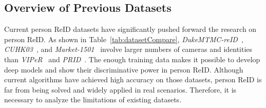 \documentclass[10pt,twocolumn,letterpaper]{article}
\begin{document}
\begin{table*}
\footnotesize
\begin{center}
\caption{Comparison between \emph{MSMT17} and other person ReID datasets.}\label{tab:datasetCompare}
\end{center}
\end{table*}

\subsection{Overview of Previous Datasets}
Current person ReID datasets have significantly pushed forward the research on person ReID. As shown in Table~\ref{tab:datasetCompare}, \emph{DukeMTMC-reID}~\cite{zheng2017unlabeled}, \emph{CUHK03}~\cite{li2014deepreid}, and \emph{Market-1501}~\cite{zheng2015scalable} involve larger numbers of cameras and identities than \emph{VIPeR}~\cite{VIPeR} and \emph{PRID}~\cite{hirzer2011person}. The enough training data makes it possible to develop deep models and show their discriminative power in person ReID. Although current algorithms have achieved high accuracy on those datasets, person ReID is far from being solved and widely applied in real scenarios. Therefore, it is necessary to analyze the limitations of existing datasets.
\end{document}
